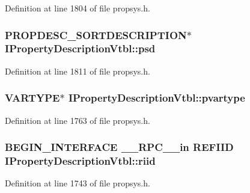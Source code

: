 Definition at line 1804 of file propsys.\+h.

\subsubsection[{\texorpdfstring{psd}{psd}}]{ {\bf P\+R\+O\+P\+D\+E\+S\+C\+\_\+\+S\+O\+R\+T\+D\+E\+S\+C\+R\+I\+P\+T\+I\+ON}$\ast$ I\+Property\+Description\+Vtbl\+::psd}\hypertarget{struct_i_property_description_vtbl_a44ea7cac0d7769b93bbfe08fe8c02a0f}{}\label{struct_i_property_description_vtbl_a44ea7cac0d7769b93bbfe08fe8c02a0f}


Definition at line 1811 of file propsys.\+h.

\subsubsection[{\texorpdfstring{pvartype}{pvartype}}]{ V\+A\+R\+T\+Y\+PE$\ast$ I\+Property\+Description\+Vtbl\+::pvartype}\hypertarget{struct_i_property_description_vtbl_a49f0862a33c3671ca77cb95848d92e13}{}\label{struct_i_property_description_vtbl_a49f0862a33c3671ca77cb95848d92e13}


Definition at line 1763 of file propsys.\+h.

\subsubsection[{\texorpdfstring{riid}{riid}}]{\setlength{\rightskip}{0pt plus 5cm}B\+E\+G\+I\+N\+\_\+\+I\+N\+T\+E\+R\+F\+A\+CE {\bf \+\_\+\+\_\+\+R\+P\+C\+\_\+\+\_\+in} {\bf R\+E\+F\+I\+ID} I\+Property\+Description\+Vtbl\+::riid}\hypertarget{struct_i_property_description_vtbl_ac0182b8bd6c87f7b3d2e6e67c3c8ff7a}{}\label{struct_i_property_description_vtbl_ac0182b8bd6c87f7b3d2e6e67c3c8ff7a}


Definition at line 1743 of file propsys.\+h.

